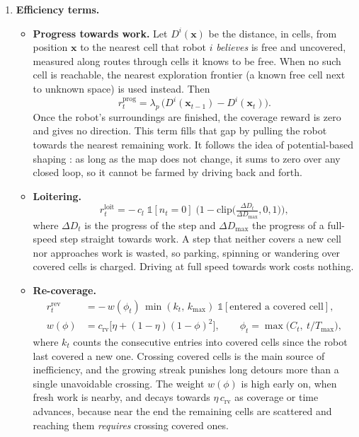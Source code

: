 \documentclass[11pt,a4paper]{article}
\begin{document}
\begin{enumerate}[label=\textbf{\arabic*.},resume]
\item \textbf{Efficiency terms.}
\begin{itemize}
 \item \textbf{Progress towards work.}
 Let $D^i(\mathbf{x})$ be the distance, in cells, from position $\mathbf{x}$
 to the nearest cell that robot $i$ \emph{believes} is free and uncovered,
 measured along routes through cells it knows to be free. When no such cell
 is reachable, the nearest exploration frontier (a known free cell next to
 unknown space) is used instead. Then
 \[
   r^{\mathrm{prog}}_t = \lambda_p\,\big(D^i(\mathbf{x}_{t-1}) - D^i(\mathbf{x}_t)\big).
 \]
 Once the robot's surroundings are finished, the coverage reward is zero and
 gives no direction. This term fills that gap by pulling the robot towards
 the nearest remaining work. It follows the idea of potential-based shaping
 \cite{ng1999policy}: as long as the map does not change, it sums to zero
 over any closed loop, so it cannot be farmed by driving back and forth.

 \item \textbf{Loitering.}
 \[
   r^{\mathrm{loit}}_t = -\,c_{l}\;\mathbb{1}[n_t = 0]\;
   \Big(1 - \mathrm{clip}\big(\tfrac{\Delta D_t}{\Delta D_{\max}},0,1\big)\Big),
 \]
 where $\Delta D_t$ is the progress of the step and $\Delta D_{\max}$ the
 progress of a full-speed step straight towards work. A step that neither
 covers a new cell nor approaches work is wasted, so parking, spinning or
 wandering over covered cells is charged. Driving at full speed towards work
 costs nothing.

 \item \textbf{Re-coverage.}
 \begin{align*}
    r^{\mathrm{rev}}_t &= -\,w(\phi_t)\,\min(k_t,\,k_{\max})\;\mathbb{1}[\text{entered a covered cell}], \\[0.5em]
    w(\phi) &= c_{\mathrm{rv}}\big[\eta + (1-\eta)(1-\phi)^2\big],
    \qquad
    \phi_t = \max\!\big(C_t,\ t/T_{\max}\big),
 \end{align*}
 where $k_t$ counts the consecutive entries into covered cells since the
 robot last covered a new one. Crossing covered cells is the main source of
 inefficiency, and the growing streak punishes long detours more than a
 single unavoidable crossing. The weight $w(\phi)$ is high early on, when
 fresh work is nearby, and decays towards $\eta\,c_{\mathrm{rv}}$ as coverage
 or time advances, because near the end the remaining cells are scattered
 and reaching them \emph{requires} crossing covered ones.
\end{itemize}


\end{enumerate}
\end{document}

